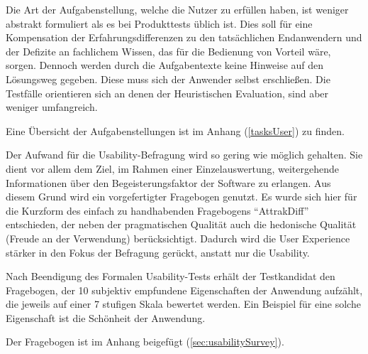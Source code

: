 Die Art der Aufgabenstellung, welche die Nutzer zu erfüllen haben, ist weniger abstrakt formuliert als es bei Produkttests üblich ist. Dies soll für eine Kompensation der Erfahrungsdifferenzen zu den tatsächlichen Endanwendern und der Defizite an fachlichem Wissen, das für die Bedienung von Vorteil wäre, sorgen. Dennoch werden durch die Aufgabentexte keine Hinweise auf den Lösungsweg gegeben. Diese muss sich der Anwender selbst erschließen. Die Testfälle orientieren sich an denen der Heuristischen Evaluation, sind aber weniger umfangreich.\par
Eine Übersicht der Aufgabenstellungen ist im Anhang (\ref{tasksUser}) zu finden.\par
{}
Der Aufwand für die Usability-Befragung wird so gering wie möglich gehalten. Sie dient vor allem dem Ziel, im Rahmen einer Einzelauswertung, weitergehende Informationen über den Begeisterungsfaktor der Software zu erlangen. Aus diesem Grund wird ein vorgefertigter Fragebogen genutzt. Es wurde sich hier für die Kurzform des einfach zu handhabenden Fragebogens \enquote{AttrakDiff} entschieden, der neben der pragmatischen Qualität auch die hedonische Qualität (Freude an der Verwendung) berücksichtigt. Dadurch wird die User Experience stärker in den Fokus der Befragung gerückt, anstatt nur die Usability.\cite[S. 237]{Ullenboom2012}\par
Nach Beendigung des Formalen Usability-Tests erhält der Testkandidat den Fragebogen, der 10 subjektiv empfundene Eigenschaften der Anwendung aufzählt, die jeweils auf einer 7 stufigen Skala bewertet werden. Ein Beispiel für eine solche Eigenschaft ist die Schönheit der Anwendung.\par
Der Fragebogen ist im Anhang beigefügt (\ref{sec:usabilitySurvey}).\par
